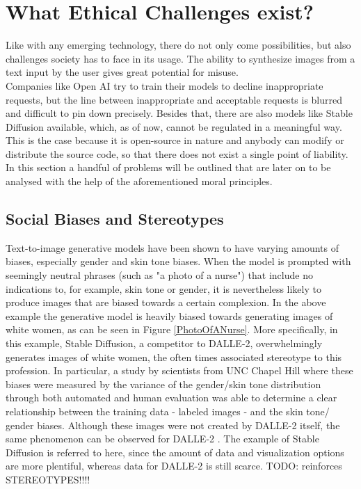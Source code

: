 \documentclass[10pt,twocolumn,twoside]{osajnl}
\begin{document}
\section{What Ethical Challenges exist?}
Like with any emerging technology, there do not only come possibilities, but also challenges society has to face in its usage.
The ability to synthesize images from a text input by the user gives great potential for misuse. \\
Companies like Open AI try to train their models to decline inappropriate requests, but the line between inappropriate and acceptable requests is blurred and difficult to pin down precisely. 
Besides that, there are also models like Stable Diffusion \cite{StableDiffusion} available, which, as of now, cannot be regulated in a meaningful way. 
This is the case because it is open-source in nature and anybody can modify or distribute the source code, so that there does not exist a single point of liability.
In this section a handful of problems will be outlined that are later on to be analysed with the help of the aforementioned moral principles.

\subsection{Social Biases and Stereotypes}
Text-to-image generative models have been shown to have varying amounts of biases, especially gender and skin tone biases. 
When the model is prompted with seemingly neutral phrases (such as "a photo of a nurse") that include no indications to, for example, skin tone or gender, it is nevertheless likely to produce images that are biased towards a certain complexion.
In the above example the generative model is heavily biased towards generating images of white women, as can be seen in Figure \ref{PhotoOfANurse}. 
More specifically, in this example, Stable Diffusion, a competitor to DALLE-2, overwhelmingly generates images of white women, the often times associated stereotype to this profession.
In particular, a study by scientists from UNC Chapel Hill where these biases were measured by the variance of the gender/skin tone distribution through both automated and human evaluation
was able to determine a clear relationship between the training data - labeled images - and the skin tone/ gender biases\cite{DallEval}. 
Although these images were not created by DALLE-2 itself, the same phenomenon can be observed for DALLE-2 \cite{DalleSocialBias}. The example of Stable Diffusion is referred to here, since the 
amount of data and visualization options are more plentiful, whereas data for DALLE-2 is still scarce. TODO: reinforces STEREOTYPES!!!!
\end{document}
